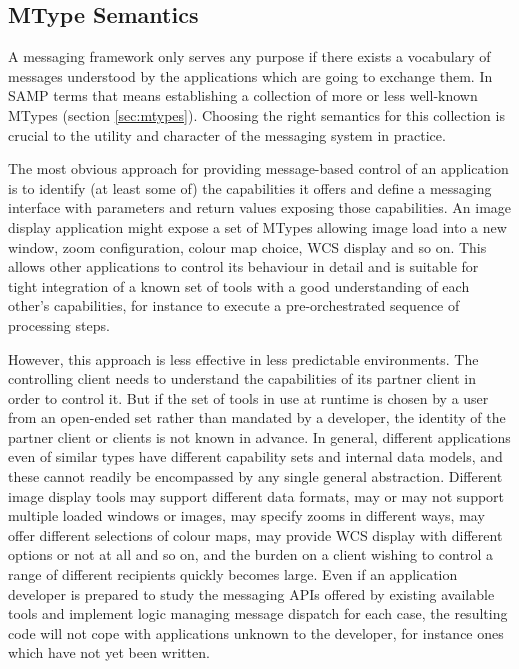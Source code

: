 \documentclass[5p]{elsarticle}
\begin{document}
\subsection{MType Semantics} \label{sec:messageSemantics}

A messaging framework only serves any purpose if there exists
a vocabulary of messages understood by the
applications which are going to exchange them.
In SAMP terms that means establishing a collection of
more or less well-known MTypes (section \ref{sec:mtypes}).
Choosing the right semantics for this collection is crucial
to the utility and character of the messaging system in practice.

The most obvious approach for providing message-based control
of an application
is to identify (at least some of) the capabilities it offers and
define a messaging interface with parameters and return values
exposing those capabilities.  An image display application might
expose a set of MTypes allowing image load into a new window,
zoom configuration, colour map choice, WCS display and so on.
This allows other applications to control its behaviour
in detail and is suitable for tight integration of a known set
of tools with a good understanding of each other's capabilities,
for instance to execute a pre-orchestrated sequence of processing steps.

However, this approach is less effective in less predictable environments.
The controlling client needs to understand
the capabilities of its partner client in order to control it.
But if the set of tools in use at runtime is chosen by a
user from an open-ended set
rather than mandated by a developer, the identity of the
partner client or clients is not known in advance.
In general, different applications even of similar types
have different capability sets
and internal data models, and these cannot readily be encompassed
by any single general abstraction.
Different image display tools
may support different data formats,
may or may not support multiple loaded windows or images,
may specify zooms in different ways,
may offer different selections of colour maps,
may provide WCS display with different options or not at all
and so on,
and the burden on a client wishing to control a range
of different recipients quickly becomes large.
Even if an application developer is prepared to study the
messaging APIs offered by existing available tools and implement logic
managing message dispatch for each case,
the resulting code will not cope with applications
unknown to the developer,
for instance ones which have not yet been written.
\end{document}
